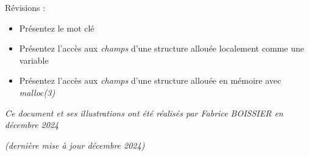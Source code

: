 \documentclass[11pt,a4paper]{article}
\begin{document}
Révisions :

\begin{itemize}
\item Présentez le mot clé 
\item Présentez l'accès aux \textit{champs} d'une structure allouée localement comme une variable
\item Présentez l'accès aux \textit{champs} d'une structure allouée en mémoire avec \textit{malloc(3)}
\end{itemize}



\bigskip

\vfillFirst

\vfillLast

\begin{center}
\textit{Ce document et ses illustrations ont été réalisés par Fabrice BOISSIER en décembre 2024}

\textit{(dernière mise à jour décembre 2024)}
\end{center}
\end{document}
